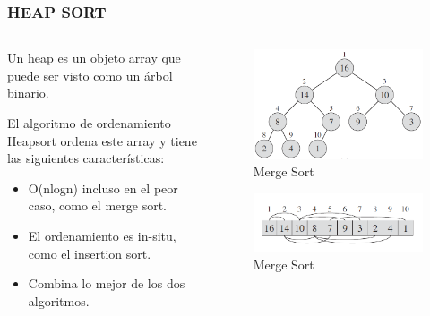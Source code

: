 \documentclass[
	11pt, %
]{beamer}
\begin{document}
\begin{frame}
	\frametitle{HEAP SORT}
    \begin{columns}[t] %
		\begin{column}{0.45\textwidth} %
            Un heap es un objeto array que puede ser visto como un árbol binario.

            El algoritmo de ordenamiento Heapsort ordena este array y tiene las siguientes características:
            \begin{itemize}
              \item O(nlogn) incluso en el peor caso, como el merge sort.
              \item El ordenamiento es in-situ, como el insertion sort.
              \item Combina lo mejor de los dos algoritmos.
            \end{itemize}
		\end{column}		
		\begin{column}{0.5\textwidth} %
			\begin{figure}
		      \includegraphics[width=0.5\linewidth]{heapSort_a.png}
		      \caption{Merge Sort}
	   \end{figure}
					\begin{figure}
		      \includegraphics[width=0.5\linewidth]{heapSort_b.png}
		      \caption{Merge Sort}
	   \end{figure}
		\end{column}
	\end{columns}
\end{frame}
\end{document}
